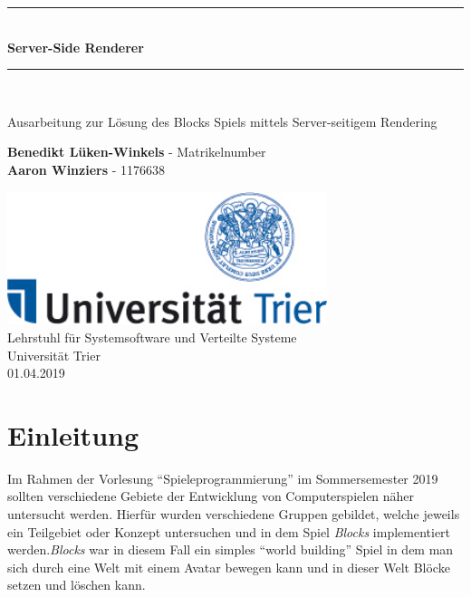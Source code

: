 \documentclass[11pt,parskip=full]{scrartcl}
\newcommand{\HRule}[1]{\rule{\linewidth}{#1}}
\begin{document}
\begin{titlepage}
  \begin{center}
    \vspace*{2cm}
    \HRule{1pt} \\
    \vspace{.5 cm}
    \textbf{\Huge Server-Side Renderer}
    \HRule{2pt} \\ [1cm]

    \vspace{1.5cm}

    \Large{
      Ausarbeitung zur Lösung des Blocks Spiels mittels Server-seitigem Rendering
    }
    \vspace{1.5cm}

    \textbf{\Large Benedikt Lüken-Winkels} - \large Matrikelnumber \\
    [3pt]
    \textbf{\Large Aaron Winziers} - \large 1176638

    \vfill

    \includegraphics[width=0.7\textwidth]{Logo-Uni-Trier}\\
    [1cm]
    Lehrstuhl für Systemsoftware und Verteilte Systeme\\
    Universität Trier\\
    01.04.2019

  \end{center}
\end{titlepage}
\newpage

\section{Einleitung}

Im Rahmen der Vorlesung ``Spieleprogrammierung'' im Sommersemester 2019 sollten verschiedene Gebiete der Entwicklung von Computerspielen näher untersucht werden. Hierfür wurden verschiedene Gruppen gebildet, welche jeweils ein Teilgebiet oder Konzept untersuchen und in dem Spiel \textit{Blocks} implementiert werden.\textit{Blocks} war in diesem Fall ein simples ``world building'' Spiel in dem man sich durch eine Welt mit einem Avatar bewegen kann und in dieser Welt Blöcke setzen und löschen kann.
\end{document}
